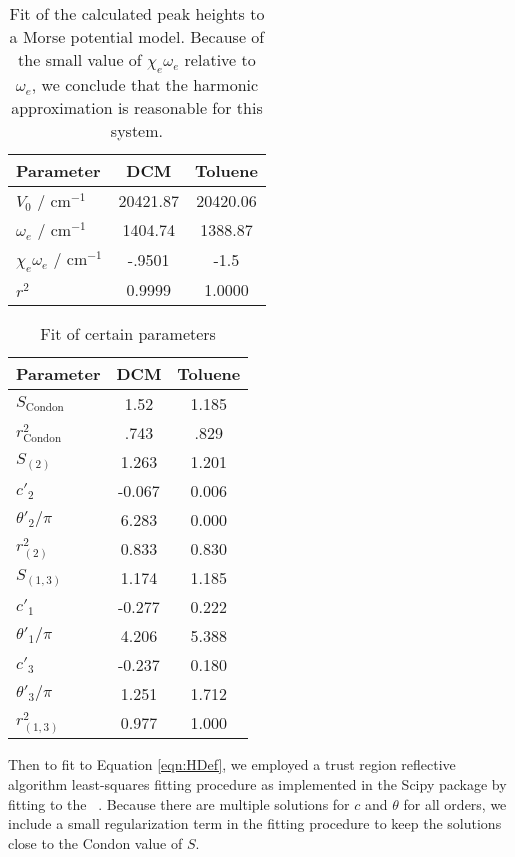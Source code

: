 \begin{table}
 \begin{tabular}{lcc}
 \hline
 Parameter & DCM & Toluene \\
 \hline
 $V_0$ / cm$^{-1}$  & 20421.87 &  20420.06\\
 $\omega_e$ / cm$^{-1}$ & 1404.74 & 1388.87 \\
 $\chi_e \omega_e$ / cm$^{-1}$ & -.9501 &  -1.5 \\
 $r^2$ & 0.9999 &  1.0000 \\
 \hline
\end{tabular}
\caption{ Fit of the calculated peak heights to a Morse potential model.  Because of the small value of $\chi_e \omega_e$ relative to $\omega_e$, we conclude that the harmonic approximation is reasonable for this system.}
\label{table:energyFit}
\end{table}


\begin{table}
 \begin{tabular}{lcc}
 \hline
 \textbf{Parameter} & \textbf{DCM} & \textbf{Toluene} \\
 \hline
 $S_{\text{Condon}}$ & 1.52 & 1.185 \\
 $r^2_{\text{Condon}}$ & .743 & .829\\
 \hline
 $S_{ (2) }$ & 1.263  &  1.201 \\
 $c'_{ 2 }$ & -0.067  &  0.006 \\
 $\theta'_{ 2 } / \pi $& 6.283  &  0.000 \\
 $r^2_{ (2) }$ & 0.833  &  0.830 \\
 \hline
 $S_{ (1, 3) }$ & 1.174  &  1.185 \\
 $c'_{ 1 }$ & -0.277  &  0.222 \\
 $\theta'_{ 1 } / \pi $& 4.206  &  5.388 \\
 $c'_{ 3 }$ & -0.237  &  0.180 \\
 $\theta'_{ 3 } / \pi $& 1.251  &  1.712 \\
 $r^2_{ (1, 3) }$ & 0.977  &  1.000 \\
 \hline
\end{tabular}
\caption{Fit of certain parameters}
\label{table:peakFit}
\end{table}

Then to fit to Equation \ref{eqn:HDef}, we employed a trust region reflective algorithm least-squares fitting procedure as implemented in the Scipy package by fitting to the ~\cite{scipy,numpy}.  Because there are multiple solutions for $c$ and $\theta$ for all orders, we include a small regularization term in the fitting procedure to keep the solutions close to the Condon value of $S$.

